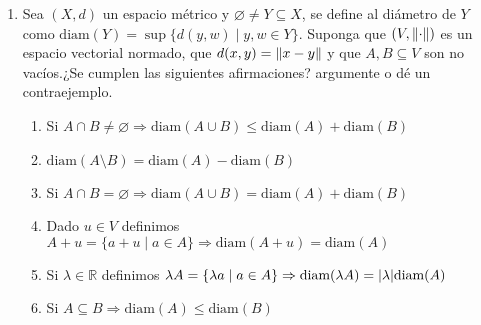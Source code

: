 \documentclass[12pt]{article}
\newcommand\R{\ensuremath{\mathbb{R}}}
\begin{document}
\begin{enumerate}[label=\textbf{\arabic*}.]
\begin{proof}
    Sea $x,y \in X \Rightarrow \forall \: z \in A$ s.t.q.

    \begin{equation*}
        {d}^{\prime}(A,x) \leqslant d(x,z) \leqslant d(x,y) + d(y,z)
    \end{equation*}
    \begin{equation*}
        {d}^{\prime}(A,y) \leqslant d(y,z) \leqslant d(y,x) + d(x,z)
    \end{equation*}

    Podemos tomar el ínfimo en $z$, ya que la desigualdad se cumple para todas las métricas

    \begin{equation*}
        {d}^{\prime}(A,x) \leqslant d(x,y) + {d}^{\prime}(A,y) \Rightarrow  {d}^{\prime}(A,x) - {d}^{\prime}(A,y)  \leqslant d(x,y) 
    \end{equation*}
    \begin{equation*}
        {d}^{\prime}(A,y)  \leqslant d(y,x) + {d}^{\prime}(A,x) \Rightarrow {d}^{\prime}(A,y) - {d}^{\prime}(A,x) \leqslant d(y,x)
    \end{equation*}

    Esto implica $\abs{{d}^{\prime}(A,x)-{d}^{\prime}(A,y)} \leqslant d(x,y)$
\end{proof}

\item Sea $(X,d)$ un espacio métrico y $\varnothing \neq Y \subseteq X$, se define al diámetro de $Y$ como $\text{diam} (Y) = \sup \{ d(y,w) \mid y, w \in Y\}$. Suponga que $(V, \norm{\cdot})$ es un espacio vectorial normado, que $d(x,y) = \norm{x-y}$ y que $A, B \subseteq V$ son no vacíos.¿Se cumplen las siguientes afirmaciones? argumente o dé un contraejemplo.

\begin{enumerate}
    \item Si $A \cap B \neq \varnothing \Rightarrow \text{diam} (A \cup B) \leqslant \text{diam} (A) + \text{diam} (B)$
    \item $\text{diam} (A \setminus B) = \text{diam} (A) - \text{diam} (B)$
    \item Si $A \cap B = \varnothing \Rightarrow \text{diam} (A \cup B) = \text{diam} (A) + \text{diam} (B)$
    \item Dado $u \in V$ definimos $A + u = \{a + u \mid a \in A \} \Rightarrow \text{diam} (A + u) = \text{diam} (A)$
    \item Si $\lambda \in \R$ definimos $\lambda A = \{ \lambda a \mid a \in A \} \Rightarrow \text{diam} (\lambda A) = \abs{\lambda} \text{diam} (A)$
    \item Si $A \subseteq B \Rightarrow \text{diam} (A) \leqslant \text{diam} (B)$
\end{enumerate}


\end{enumerate}
\end{document}
